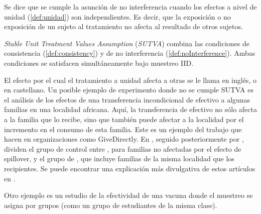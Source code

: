 \begin{definicion}[No interferencia]\label{def:noInterference}
    Se dice que se cumple la asunción de no interferencia cuando los efectos a nivel de unidad (\autoref{def:unidad}) son independientes.
    Es decir, que la exposición o no exposición de un sujeto al tratamiento no afecta al resultado de otros sujetos.
\end{definicion}


\begin{definicion}[SUTVA]
    \textit{Stable Unit Treatment Values Assumption} (\textit{SUTVA}) combina las condiciones de
    consistencia (\ref{def:consistency}) y de no interferencia (\ref{def:noInterference}).
    Ambas condiciones se satisfacen simultáneamente bajo muestreo IID.
\end{definicion}

\begin{ejemplo}
    El efecto por el cual el tratamiento a unidad afecta a otras se le llama \textit{} en inglés, o  en castellano.
    Un posible ejemplo de experimento donde no se cumple SUTVA es el análisis %
    de los efectos de una transferencia incondicional de efectivo a algunas familias en una localidad africana.
    Aquí, la transferencia de efectivo no sólo afecta a la familia que lo recibe, sino
    que también puede afectar a la localidad por el incremento en el consumo
    de esta familia.
    Este es un ejemplo del trabajo que hacen en organizaciones como GiveDirectly.
    En \cite{Haushofer2016}, seguido posteriormente por \cite{Egger2022},
    dividen el grupo de control entre , para familias no afectadas por
    el efecto de spillover, y el grupo de , que incluye familias
    de la misma localidad que los recipientes.
    Se puede encontrar una explicación más divulgativa de estos artículos en \cite{GiveDirectly2016}.

    Otro ejemplo es un estudio de la efectividad de una vacuna donde el muestreo se asigna por grupos (como un grupo
    de estudiantes de la misma clase)\cite{oxChapterCausal}.
\end{ejemplo}
